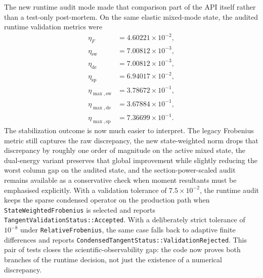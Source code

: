 The new runtime audit mode made that comparison part of the API itself rather
than a test-only post-mortem.  On the same elastic mixed-mode state, the
audited runtime validation metrics were
\begin{align}
  \eta_{F} &= 4.60221\times 10^{-2}, \\
  \eta_{\mathrm{sw}} &= 7.00812\times 10^{-3}, \\
  \eta_{\mathrm{de}} &= 7.00812\times 10^{-3}, \\
  \eta_{\mathrm{sp}} &= 6.94017\times 10^{-2}, \\
  \eta_{\max,\mathrm{sw}} &= 3.78672\times 10^{-1}, \\
  \eta_{\max,\mathrm{de}} &= 3.67884\times 10^{-1}, \\
  \eta_{\max,\mathrm{sp}} &= 7.36699\times 10^{-1}.
\end{align}
The stabilization outcome is now much easier to interpret.  The legacy
Frobenius metric still captures the raw discrepancy, the new
state-weighted norm drops that discrepancy by roughly one order of magnitude on
the active mixed state, the dual-energy variant preserves that global
improvement while slightly reducing the worst column gap on the audited state,
and the section-power-scaled audit remains available as a conservative check
when moment resultants must be emphasised explicitly.
With a validation tolerance of \(7.5\times 10^{-2}\), the runtime audit keeps
the sparse condensed operator on the production path when
\texttt{StateWeightedFrobenius} is selected and reports
\texttt{TangentValidationStatus::Accepted}.  With a deliberately strict
tolerance of \(10^{-8}\) under \texttt{RelativeFrobenius}, the same case falls
back to adaptive finite differences and reports
\texttt{CondensedTangentStatus::ValidationRejected}.  This pair of tests closes
the scientific-observability gap: the code now proves both branches of the
runtime decision, not just the existence of a numerical discrepancy.

